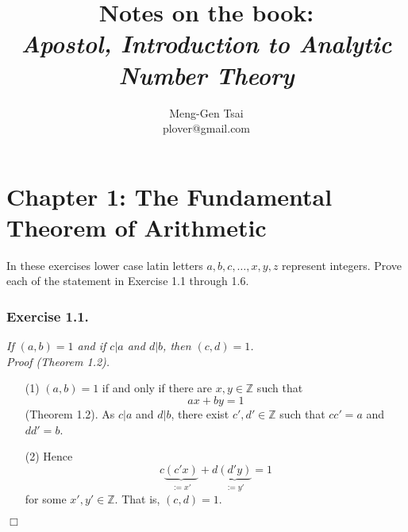 \documentclass{article}
\title{\textbf{Notes on the book: \\
\emph{Apostol, Introduction to Analytic Number Theory}}}
\author{Meng-Gen Tsai \\ plover@gmail.com}
\begin{document}
\maketitle
\tableofcontents












\newpage
\section*{Chapter 1: The Fundamental Theorem of Arithmetic \\}






In these exercises lower case latin letters $a, b, c, \ldots, x, y, z$ represent integers.
Prove each of the statement in Exercise 1.1 through 1.6. \\



\subsubsection*{Exercise 1.1.}
\emph{If $(a,b) = 1$ and if $c|a$ and $d|b$, then $(c,d) = 1$.} \\



\emph{Proof (Theorem 1.2).}
\begin{enumerate}
\item[(1)]
  $(a,b) = 1$ if and only if there are $x, y \in \mathbb{Z}$ such that
  \[
    ax + by = 1
  \]
  (Theorem 1.2).
  As $c|a$ and $d|b$, there exist $c', d' \in \mathbb{Z}$ such that
  $cc' = a$ and $dd' = b$.

\item[(2)]
  Hence
  \[
    c\underbrace{(c'x)}_{:= x'} + d\underbrace{(d'y)}_{:= y'} = 1
  \]
  for some $x', y' \in \mathbb{Z}$.
  That is, $(c,d) = 1$.
\end{enumerate}
$\Box$ \\
\end{document}
